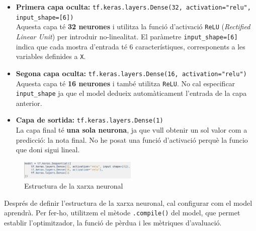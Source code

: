 \begin{itemize}
    \item \textbf{Primera capa oculta:} \texttt{tf.keras.layers.Dense(32, activation="relu", input\_shape=[6])} \\
    Aquesta capa té \textbf{32 neurones} i utilitza la funció d’activació \texttt{ReLU} (\textit{Rectified Linear Unit}) per introduir no-linealitat. El paràmetre \texttt{input\_shape=[6]} indica que cada mostra d’entrada té 6 característiques, corresponents a les variables definides a \texttt{X}.

    \item \textbf{Segona capa oculta:} \texttt{tf.keras.layers.Dense(16, activation="relu")} \\
    Aquesta capa té \textbf{16 neurones} i també utilitza \texttt{ReLU}. No cal especificar \texttt{input\_shape} ja que el model dedueix automàticament l’entrada de la capa anterior.

    \item \textbf{Capa de sortida:} \texttt{tf.keras.layers.Dense(1)} \\
    La capa final té \textbf{una sola neurona}, ja que vull obtenir un sol valor com a predicció: la nota final. No he posat una funció d'activació perquè la funcio que doni sigui lineal.
\end{itemize}

\begin{figure}[H]
    \centering
    \includegraphics[width=0.5\textwidth]{./figures/26.png}
    \caption{Estructura de la xarxa neuronal}
\end{figure}

Després de definir l’estructura de la xarxa neuronal, cal configurar com el model aprendrà. Per fer-ho, utilitzem el mètode \texttt{.compile()} del model, que permet establir l’optimitzador, la funció de pèrdua i les mètriques d’avaluació.

